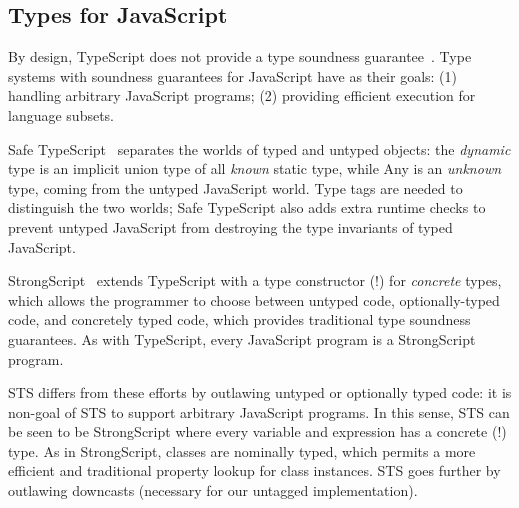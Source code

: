 






\subsection{Types for JavaScript}

By design, TypeScript does not provide a type soundness guarantee~\cite{BiermanAT14}.
Type systems with soundness guarantees for JavaScript have as their
goals: (1) handling arbitrary JavaScript programs;
(2) providing efficient execution for language subsets.

Safe TypeScript~\cite{SafeTypeScript15} separates the worlds of typed and untyped
objects: the \emph{dynamic} type is an implicit union type of all \emph{known} static type,
while Any is an \emph{unknown} type, coming from the untyped JavaScript world. Type tags
are needed to distinguish the two worlds; Safe TypeScript also adds extra runtime checks
to prevent untyped JavaScript from destroying the type invariants of typed JavaScript.

StrongScript~\cite{StrongScriptECOOP15} extends TypeScript with a type constructor (!)
for \emph{concrete} types, which allows the programmer to choose between untyped
code, optionally-typed code, and concretely typed code, which provides traditional
type soundness guarantees. As with TypeScript, every JavaScript program is a StrongScript program. 

STS differs from these efforts by outlawing untyped or optionally typed
code: it is non-goal of STS to support arbitrary JavaScript programs.
In this sense, STS can be seen to be StrongScript where every variable and
expression has a concrete (!) type. As in StrongScript, classes are nominally typed,
which permits a more efficient and traditional property lookup for class instances.
STS goes further by outlawing downcasts (necessary for our untagged
implementation).


